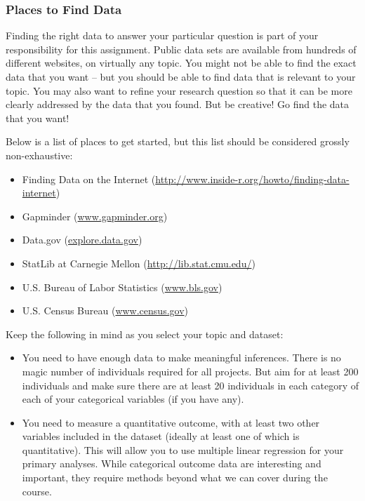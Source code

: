 \documentclass[10pt]{article}
\begin{document}
\subsubsection*{Places to Find Data}
Finding the right data to answer your particular question is part of your responsibility for this assignment. Public data sets are available from hundreds of different websites, on virtually any topic. You might not be able to find the exact data that you want -- but you should be able to find data that is relevant to your topic. You may also want to refine your research question so that it can be more clearly addressed by the data that you found. But be creative! Go find the data that you want!

Below is a list of places to get started, but this list should be considered grossly non-exhaustive:
	\begin{itemize}
		\item Finding Data on the Internet (\url{http://www.inside-r.org/howto/finding-data-internet})
		\item Gapminder (\url{www.gapminder.org})
		\item Data.gov (\url{explore.data.gov})
		\item StatLib at Carnegie Mellon (\url{http://lib.stat.cmu.edu/})
		\item U.S. Bureau of Labor Statistics (\url{www.bls.gov})
		\item U.S. Census Bureau (\url{www.census.gov})
	\end{itemize}


	Keep the following in mind as you select your topic and dataset:
	\begin{itemize}
		\item You need to have enough data to make meaningful inferences.  There is no magic number of individuals required for all projects.  But aim for at least 200 individuals and make sure there are at least 20 individuals in each category of each of your categorical variables (if you have any). 
		\item You need to measure a quantitative outcome, with at least two other variables included in the dataset (ideally at least one of which is quantitative).  This will allow you to use multiple linear regression for your primary analyses.  While categorical outcome data are interesting and important, they require methods beyond what we can cover during the course.
	\end{itemize}
	
\end{document}
